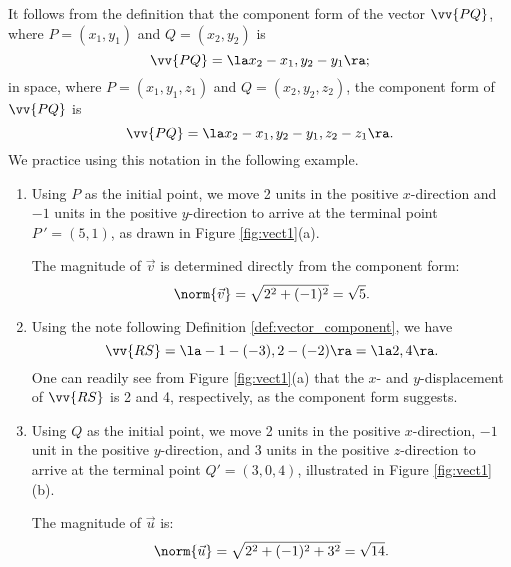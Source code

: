 It follows from the definition that the component form of the vector $\vv{PQ}$, where $P=(x_1,y_1)$ and $Q=(x_2,y_2)$ is $$\vv{PQ} = \la x_2-x_1, y_2-y_1\ra;$$ in space, where $P=(x_1,y_1,z_1)$ and $Q=(x_2,y_2,z_2)$, the component form of $\vv{PQ}$ is	$$\vv{PQ} = \la x_2-x_1, y_2-y_1,z_2-z_1\ra.$$
We practice using this notation in the following example.\\

{\begin{enumerate}
	\item Using $P$ as the initial point, we move 2 units in the positive $x$-direction and $-1$ units in the positive $y$-direction to arrive at the terminal point $P\,'=(5,1)$, as drawn in Figure \ref{fig:vect1}(a).
	
	The magnitude of $\vec v$ is determined directly from the component form:
	$$\norm{\vec v} =\sqrt{2^2+(-1)^2} = \sqrt{5}. $$
	
	\item		Using the note following Definition \ref{def:vector_component}, we have
	$$\vv{RS} = \la -1-(-3), 2-(-2)\ra = \la 2,4\ra.$$ One can readily see from Figure \ref{fig:vect1}(a) that the $x$- and $y$-displacement of $\vv{RS}$ is 2 and 4, respectively, as the component form suggests.
	
	\item		Using $Q$ as the initial point, we move 2 units in the positive $x$-direction, $-1$ unit in the positive $y$-direction, and 3 units in the positive $z$-direction to arrive at the terminal point $Q' = (3,0,4)$, illustrated in Figure \ref{fig:vect1}(b).
	
	The magnitude of $\vec u$ is:
	$$\norm{\vec u} = \sqrt{2^2+(-1)^2+3^2} = \sqrt{14}.$$
\end{enumerate}}

